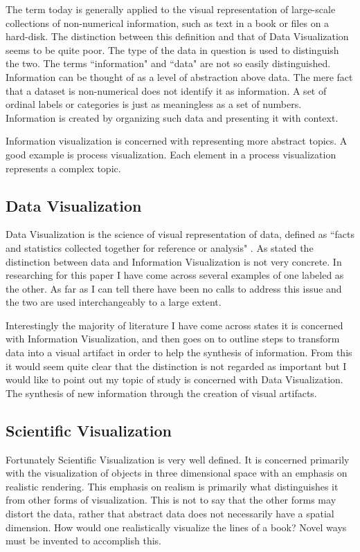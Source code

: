 \documentclass[a4paper, 10pt, titlepage, twocolumn, onehalfspace]{article}
\begin{document}
The term today is generally applied to the visual representation of large-scale collections of non-numerical information, such as text in a book or files on a hard-disk. The distinction between this definition and that of Data Visualization seems to be quite poor. The type of the data in question is used to distinguish the two. The terms ``information" and ``data" are not so easily distinguished. Information can be thought of as a level of abstraction above data. The mere fact that a dataset is non-numerical does not identify it as information. A set of ordinal labels or categories is just as meaningless as a set of numbers. Information is created by organizing such data and presenting it with context.

Information visualization is concerned with representing more abstract topics. A good example is process visualization. Each element in a process visualization represents a complex topic.

\subsection{Data Visualization}
Data Visualization is the science of visual representation of data, defined as ``facts and statistics collected together for reference or analysis" \cite{oed31}. As stated the distinction between data and Information Visualization is not very concrete. In researching for this paper I have come across several examples of one labeled as the other. As far as I can tell there have been no calls to address this issue and the two are used interchangeably to a large extent.

Interestingly the majority of literature I have come across states it is concerned with Information Visualization, and then goes on to outline steps to transform data into a visual artifact in order to help the synthesis of information. From this it would seem quite clear that the distinction is not regarded as important but I would like to point out my topic of study is concerned with Data Visualization. The synthesis of new information through the creation of visual artifacts.

\subsection{Scientific Visualization}
Fortunately Scientific Visualization is very well defined. It is concerned primarily with the visualization of objects in three dimensional space with an emphasis on realistic rendering. This emphasis on realism is primarily what distinguishes it from other forms of visualization. This is not to say that the other forms may distort the data, rather that abstract data does not necessarily have a spatial dimension. How would one realistically visualize the lines of a book? Novel ways must be invented to accomplish this.
\end{document}
